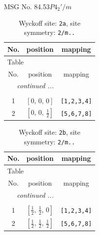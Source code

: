 \documentclass[fleqn,8pt]{jsarticle}
\begin{document}
\setcounter{MaxMatrixCols}{32}

\renewcommand{\tablename}{Table~}
\renewcommand{\figurename}{Figure~}
\begin{center}
\LARGE
MSG No. 84.53\quad$P4_{2}'/m$
\end{center}
\renewcommand{\arraystretch}{1.2}
\begin{longtable}{ccc}
\caption{Wyckoff site: {\tt 2a}, site symmetry: {\tt 2/m..}}
 \\
 \hline \hline
No. & position & mapping \\ \hline \endfirsthead

\multicolumn{2}{l}{\tablename\ \thetable{}} \\
 \hline \hline
No. & position & mapping \\ \hline \endhead

 \hline \hline
\multicolumn{2}{r}{\footnotesize\it continued ...} \\ \endfoot

 \hline \hline
\multicolumn{2}{r}{} \\ \endlastfoot

1 & $\left[ 0,\, 0,\, 0 \right]$ & {\tt [1,2,3,4]} \\ \hline
2 & $\left[ 0,\, 0,\, \frac{1}{2} \right]$ & {\tt [5,6,7,8]} \\
\end{longtable}
\renewcommand{\arraystretch}{1.2}
\begin{longtable}{ccc}
\caption{Wyckoff site: {\tt 2b}, site symmetry: {\tt 2/m..}}
 \\
 \hline \hline
No. & position & mapping \\ \hline \endfirsthead

\multicolumn{2}{l}{\tablename\ \thetable{}} \\
 \hline \hline
No. & position & mapping \\ \hline \endhead

 \hline \hline
\multicolumn{2}{r}{\footnotesize\it continued ...} \\ \endfoot

 \hline \hline
\multicolumn{2}{r}{} \\ \endlastfoot

1 & $\left[ \frac{1}{2},\, \frac{1}{2},\, 0 \right]$ & {\tt [1,2,3,4]} \\ \hline
2 & $\left[ \frac{1}{2},\, \frac{1}{2},\, \frac{1}{2} \right]$ & {\tt [5,6,7,8]} \\
\end{longtable}
\end{document}
